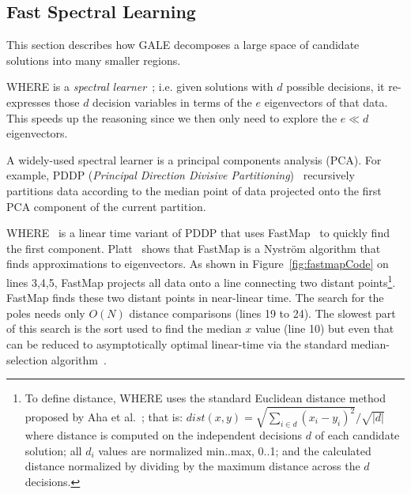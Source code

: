 \documentclass[10pt,journal,compsoc]{IEEEtran}
\newcommand{\fig}[1]{Figure~\ref{fig:#1}}
\begin{document}
 


\subsection{Fast Spectral Learning}\label{sec:spectral}
This section describes how GALE decomposes a large space of candidate solutions into many smaller regions.

WHERE is a {\em spectral learner}~\cite{KamvarKM03}; i.e. given solutions with $d$ possible decisions, it re-expresses those $d$ decision variables in terms of the $e$ eigenvectors of that data.
This speeds up the reasoning since we then only need to explore the $e\ll d$   eigenvectors.

A widely-used spectral learner is a principal components analysis (PCA). For example, PDDP ({\em Principal Direction Divisive Partitioning})~\cite{boley98} recursively partitions data according to the median point of data projected onto the first PCA component of the current partition.

WHERE~\cite{me12d} is a linear time variant of PDDP  that uses FastMap~\cite{Faloutsos1995} to quickly find the first component.
Platt~\cite{platt05} shows that FastMap is a  Nystr\"om algorithm that finds approximations to eigenvectors.
As shown in \fig{fastmapCode} on lines 3,4,5, FastMap  projects all data onto a line connecting two distant points\footnote{
To define distance, WHERE uses the standard Euclidean distance method proposed by Aha et al.~\cite{aha91}; that is: $dist(x,y)= \sqrt{\sum_{i\in d} (x_i - y_i)^2}/\sqrt{ \left\vert{d}\right\vert }$ where distance is computed on the independent decisions $d$ of each candidate solution; all $d_i$ values are normalized min..max, 0..1; and the calculated distance normalized by dividing by the maximum distance across the $d$ decisions.}. 
FastMap finds these two distant points in near-linear time. 
The search for the poles needs only $O(N)$ distance comparisons (lines 19 to 24).
The slowest part of this search is the sort used to find the median $x$ value (line 10) but even that can be reduced to  asymptotically optimal linear-time via the standard median-selection algorithm~\cite{hoare61}.
\end{document}
